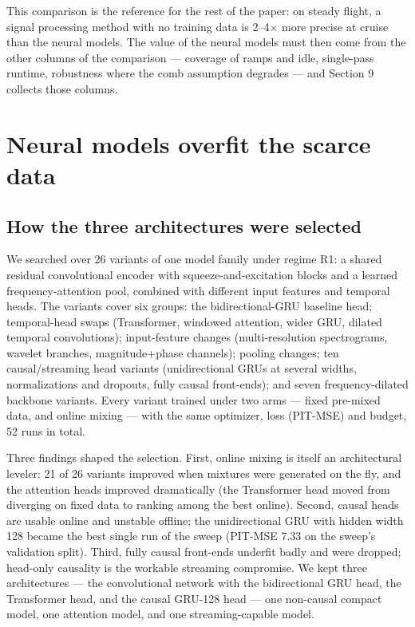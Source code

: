 \documentclass[journal]{IEEEtran}
\begin{document}
This comparison is the reference for the rest of the paper: on steady
flight, a signal processing method with no training data is 2--4$\times$ more
precise at cruise than the neural models. The value of the neural models
must then come from the other columns of the comparison --- coverage of ramps
and idle, single-pass runtime, robustness where the comb assumption
degrades --- and Section 9 collects those columns.

\section{Neural models overfit the scarce data}
\label{sec:overfit}

\subsection{How the three architectures were selected}
\label{sec:archsearch}

We searched over 26 variants of one model family under regime R1: a shared
residual convolutional encoder with squeeze-and-excitation blocks and a
learned frequency-attention pool, combined with different input features and
temporal heads. The variants cover six groups: the bidirectional-GRU
baseline head; temporal-head swaps (Transformer, windowed attention, wider
GRU, dilated temporal convolutions); input-feature changes (multi-resolution
spectrograms, wavelet branches, magnitude+phase channels); pooling changes;
ten causal/streaming head variants (unidirectional GRUs at several widths,
normalizations and dropouts, fully causal front-ends); and seven
frequency-dilated backbone variants. Every variant trained under two arms —
fixed pre-mixed data, and online mixing — with the same optimizer, loss
(PIT-MSE) and budget, 52 runs in total.

Three findings shaped the selection. First, online mixing is itself an
architectural leveler: 21 of 26 variants improved when mixtures were
generated on the fly, and the attention heads improved dramatically (the
Transformer head moved from diverging on fixed data to ranking among the
best online). Second, causal heads are usable online and unstable offline;
the unidirectional GRU with hidden width 128 became the best single run of
the sweep (PIT-MSE 7.33 on the sweep's validation split). Third, fully
causal front-ends underfit badly and were dropped; head-only causality is
the workable streaming compromise. We kept three architectures — the
convolutional network with the bidirectional GRU head, the Transformer
head, and the causal GRU-128 head — one non-causal compact model, one
attention model, and one streaming-capable model.
\end{document}
